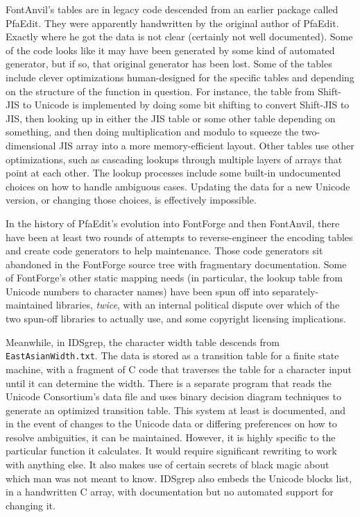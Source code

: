 \documentclass{mitsuba}
\begin{document}
FontAnvil's tables are in legacy code descended from an earlier package
called PfaEdit.  They were apparently handwritten by the original author of
PfaEdit.  Exactly where he got the data is not clear (certainly not well
documented).  Some of the code looks like it may have been generated by some
kind of automated generator, but if so, that original generator has been
lost.  Some of the tables include clever optimizations human-designed for
the specific tables and depending on the structure of the function in
question.  For instance, the table from Shift-JIS to Unicode is implemented
by doing some bit shifting to convert Shift-JIS to JIS, then looking up in
either the JIS table or some other table depending on something, and then
doing multiplication and modulo to squeeze the two-dimensional JIS array
into a more memory-efficient layout.  Other tables use other optimizations,
such as cascading lookups through multiple layers of arrays that point at
each other.  The lookup processes include some built-in undocumented choices
on how to handle ambiguous cases.  Updating the data for a new Unicode
version, or changing those choices, is effectively impossible.

In the history of PfaEdit's evolution into FontForge and then FontAnvil,
there have been at least two rounds of attempts to reverse-engineer the
encoding tables and create code generators to help maintenance.  Those code
generators sit abandoned in the FontForge source tree with fragmentary
documentation.  Some of FontForge's other static mapping needs (in
particular, the lookup table from Unicode numbers to character names) have
been spun off into separately-maintained libraries, \emph{twice}, with an
internal political dispute over which of the two spun-off libraries to
actually use, and some copyright licensing implications.

Meanwhile, in IDSgrep, the character width table descends from
\texttt{EastAsianWidth.txt}.  The data is stored as a transition table for a
finite state machine, with a fragment of C code that traverses the table for
a character input until it can determine the width.  There is a separate
program that reads the Unicode Consortium's data file and uses binary
decision diagram techniques to generate an optimized transition table.  This
system at least is documented, and in the event of changes to the
Unicode data or differing preferences on how to resolve ambiguities, it can
be maintained.  However, it is highly specific to the particular function it
calculates.  It would require significant rewriting to work with anything
else.  It also makes use of certain secrets of black magic about which man
was not meant to know.  IDSgrep also embeds the Unicode blocks list, in
a handwritten C array, with documentation but no automated support for
changing it.
\end{document}
